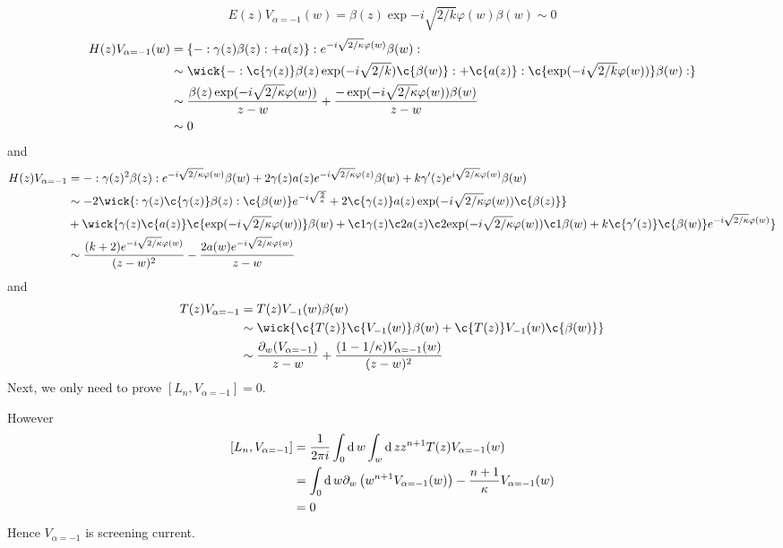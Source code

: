\subsubsection{}
\begin{equation}
	E(z)V_{\alpha=-1}(w) = \beta(z)\exp{-i \sqrt{2/k} \varphi(w)}\beta(w) \sim 0
\end{equation}
\begin{equation}
\begin{split}
	H(z)V_{\alpha =-1}(w) &= \left\{ -: \gamma(z)\beta(z): + a(z) \right\}: e^{-i \sqrt{2/\kappa} \varphi(w)}\beta(w):\\
	& \sim \wick{- : \c{\gamma(z)}\beta(z) \exp(-i\sqrt{2/k}) \c{\beta(w)}: + \c{a(z)} : \c{\exp(-i \sqrt{2/k} \varphi(w))} \beta(w): }\\
	& \sim \frac{\beta(z) \exp( -i \sqrt{2/\kappa}\varphi(w) )}{z-w} + \frac{- \exp(-i\sqrt{2/\kappa} \varphi(w))\beta(w)}{z-w}\\
	& \sim 0
\end{split}
\end{equation}
and
\begin{equation}
	\begin{split}
	H(z)V_{\alpha=-1} &= - : \gamma(z)^2 \beta(z): e^{-i \sqrt{2/\kappa}\varphi(w)} \beta(w) + 2\gamma(z)a(z) e^{-i \sqrt{2/\kappa}\varphi(z)} \beta(w) + k \gamma'(z) e^{i \sqrt{2/\kappa}\varphi(w)} \beta(w)\\
	& \sim -2 \wick{:\gamma(z) \c{\gamma(z)} \beta(z): \c{\beta(w)} e^{-i\sqrt{\frac{2}{\kappa}}} + 2 \c{\gamma(z)} a(z) \exp(-i \sqrt{2/\kappa} \varphi(w)) \c{\beta(z)}}\\
	& + \wick{\gamma(z) \c{a(z)} \c{\exp(-i \sqrt{2/\kappa}\varphi(w))} \beta(w) + \c1{\gamma(z)} \c2{a(z)} \c2{\exp(-i \sqrt{2/\kappa}\varphi(w))} \c1{\beta(w)} + k \c{\gamma'(z)} \c{\beta(w)}e^{-i \sqrt{2/\kappa}\varphi(w)} }\\ 
	& \sim \frac{(k+2)e^{-i \sqrt{2/\kappa} \varphi(w)}}{(z-w)^2} - \frac{2 a(w) e^{-i \sqrt{2/\kappa}\varphi(w)}}{z-w}
	\end{split}
\end{equation}
and 
\begin{equation}
	\begin{split}
	T(z)V_{\alpha=-1} & = T(z)V_{-1}(w)\beta(w)\\
	& \sim \wick{ \c{T(z)} \c{V_{-1}(w)} \beta(w) + \c{T(z)}V_{-1}(w) \c{\beta(w)} }\\
	& \sim \frac{\partial_w (V_{\alpha =-1})}{z-w} + \frac{(1-1/\kappa)V_{\alpha=-1}(w)}{(z-w)^2}
	\end{split}
\end{equation}
Next, we only need to prove $[L_n, V_{\alpha=-1}]=0$.

However
\begin{equation}
	\begin{split}
	[L_n,V_{\alpha=-1}] &= \frac{1}{2\pi i}\int_0 \operatorname{d} w \int_w \operatorname{d} z z^{n+1} T(z) V_{\alpha=-1}(w)\\
	&= \int_0 \operatorname{d} w \partial_w \left(w^{n+1}V_{\alpha=-1}(w) \right) - \frac{n+1}{\kappa}V_{\alpha=-1}(w)\\
	&=0
	\end{split}
\end{equation}
Hence $V_{\alpha=-1}$ is screening current.